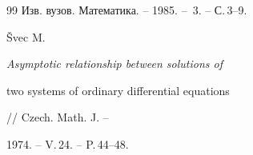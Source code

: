 \begin{thebibliography}{99}
Изв. вузов. Математика. -- 1985. -- \No\,3. -- С.\,3--9.







\v Svec M. {\em Asymptotic relationship between solutions of


two systems of ordinary differential equations} // Czech. Math. J. --


1974. -- V.\,24. -- P.\,44--48.





\end{thebibliography}





\vskip 2cm







 







\label{end}








